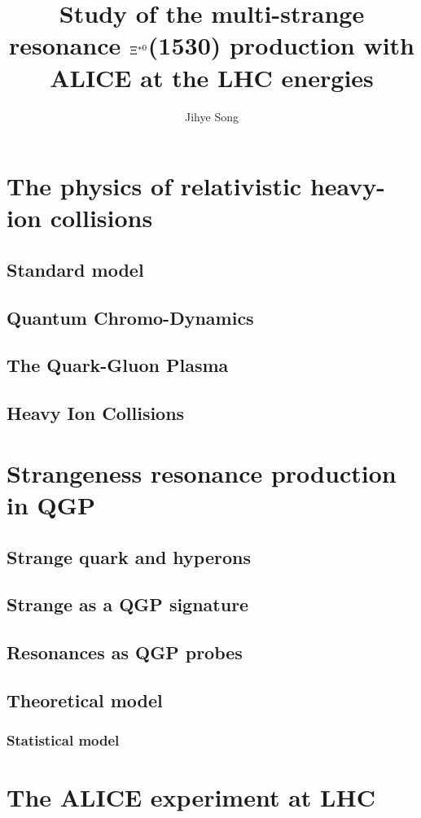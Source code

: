 \documentclass[11pt, oneside]{article}   	%
\title{Study of the multi-strange resonance $\Xi^{*0}$(1530) production with ALICE at the LHC energies}
\author{Jihye Song}
\begin{document}
\maketitle
\newpage
\tableofcontents
\newpage

\section{The physics of relativistic heavy-ion collisions}
\subsection{Standard model}
\subsection{Quantum Chromo-Dynamics}
\subsection{The Quark-Gluon Plasma}
\subsection{Heavy Ion Collisions}

\section{Strangeness resonance production in QGP}
\subsection{Strange quark and hyperons}
\subsection{Strange as a QGP signature}
\subsection{Resonances as QGP probes}
\subsection{Theoretical model}
\subsubsection{Statistical model}

\section{The ALICE experiment at LHC}
\end{document}
